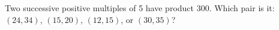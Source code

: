 Two successive positive multiples of 5 have product 300. Which pair is it: $(24,34)$, $(15,20)$, $(12,15)$, or $(30,35)$?
